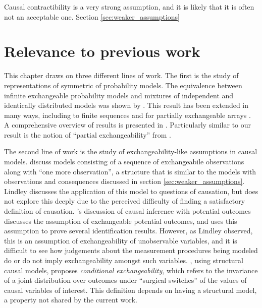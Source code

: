 Causal contractibility is a very strong assumption, and it is likely that it is often not an acceptable one. Section \ref{sec:weaker_assumptions}


\section{Relevance to previous work}\label{sec:prev_work}

This chapter draws on three different lines of work. The first is the study of representations of symmetric of probability models. The equivalence between infinite exchangeable probability models and mixtures of independent and identically distributed models was shown by \cite{de_finetti_foresight_1992}. This result has been extended in many ways, including to finite sequences \citet{kerns_definettis_2006,diaconis_finite_1980} and for partially exchangeable arrays \citet{aldous_representations_1981}. A comprehensive overview of results is presented in \citet{kallenberg_probabilistic_2005}. Particularly similar to our result is the notion of ``partial exchangeability'' from \citet{diaconis_recent_1988}.

The second line of work is the study of exchangeability-like assumptions in causal models. \citet{lindley_role_1981} discuss models consisting of a sequence of exchangeabile observations along with ``one more observation'', a structure that is similar to the models with observations and consequences discussed in section \ref{sec:weaker_assumptions}. Lindley discusses the application of this model to questions of causation, but does not explore this deeply due to the perceived difficulty of finding a satisfactory definition of causation. \citet{rubin_causal_2005}'s discussion of causal inference with potential outcomes discusses the assumption of exchangeable potential outcomes, and \citet{imbens_causal_2015} uses this assumption to prove several identification results. However, as Lindley observed, this is an assumption of exchangeability of unobservable variables, and it is difficult to see how judgements about the measurement procedures being modeled do or do not imply exchangeability amongst such variables. \citet{saarela_role_2020}, using structural causal models, proposes \emph{conditional exchangeability}, which refers to the invariance of a joint distribution over outcomes under ``surgical switches'' of the values of causal variables of interest. This definition depends on having a structural model, a property not shared by the current work.

